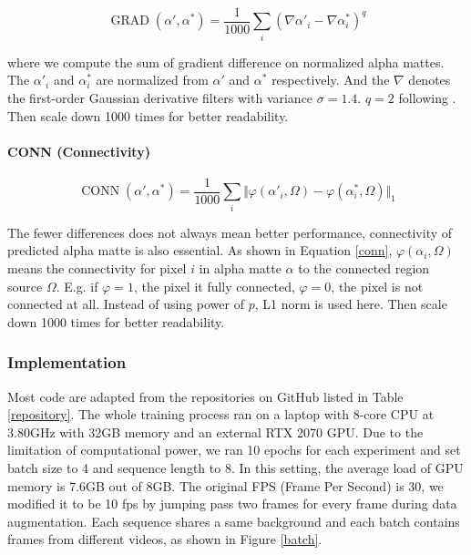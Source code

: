 \documentclass[final]{cvpr}
\begin{document}
\begin{equation}\label{grad}
    \operatorname{GRAD}(\alpha', \alpha^*)=\frac{1}{1000}\sum_i(\nabla \alpha'_i-\nabla \alpha^*_i)^q
\end{equation}

where we compute the sum of gradient difference on normalized alpha mattes.
The $\alpha'_i$ and $\alpha^*_i$ are normalized from $\alpha'$ and $\alpha^*$ respectively.
And the $\nabla$ denotes the first-order Gaussian derivative filters with variance $\sigma=1.4$. $q=2$ following \cite{linRealTimeHighResolutionBackground2020a}.
Then scale down 1000 times for better readability.

\paragraph{CONN (Connectivity)}

\begin{equation}\label{conn}
    \operatorname{CONN}(\alpha', \alpha^*)=\frac{1}{1000}\sum_i\Vert\varphi(\alpha'_i,\Omega)-\varphi(\alpha^*_i,\Omega)\Vert_1
\end{equation}

The fewer differences does not always mean better performance, connectivity of predicted alpha matte is also essential.
As shown in Equation \ref{conn}, $\varphi(\alpha_i,\Omega)$ means the connectivity for pixel $i$ in alpha matte $\alpha$ to the connected region source $\Omega$.
E.g. if $\varphi=1$, the pixel it fully connected, $\varphi=0$, the pixel is not connected at all. Instead of using power of $p$, L1 norm is used here.
Then scale down 1000 times for better readability.

\subsubsection{Implementation}

Most code are adapted from the repositories on GitHub listed in Table \ref{repository}.
The whole training process ran on a laptop with 8-core CPU at 3.80GHz with 32GB memory and an external RTX 2070 GPU.
Due to the limitation of computational power, we ran 10 epochs for each experiment and set batch size to 4 and sequence length to 8.
In this setting, the average load of GPU memory is 7.6GB out of 8GB.
The original FPS (Frame Per Second) is 30, we modified it to be 10 fps by jumping pass two frames for every frame during data augmentation.
Each sequence shares a same background and each batch contains frames from different videos, as shown in Figure \ref{batch}.
\end{document}
